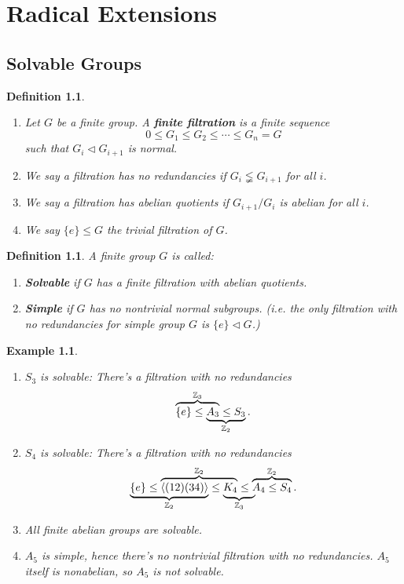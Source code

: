 \documentclass[11pt]{book}
\newtheorem{definition}[theorem]{Definition}
\newtheorem{example}[theorem]{Example}
\begin{document}
\chapter{Radical Extensions}

\section{Solvable Groups}

\begin{definition}
    \begin{enumerate}
        \item Let $G$ be a finite group. A {\bf finite filtration} is a finite sequence
        \[
        0 \leq G_{1} \leq G_{2} \leq \cdots \leq G_{n} = G
        \]
        such that $G_{i}\lhd G_{i+1}$ is normal. 
        \item We say a filtration has no redundancies if $G_{i}\lneqq  G_{i+1}$ for all $i$. 
        \item We say a filtration has abelian quotients if $G_{i+1}/G_{i}$ is abelian for all $i$. 
        \item We say $\{e\}\leq G$ the trivial filtration of $G$. 
    \end{enumerate}
\end{definition}

\begin{definition} \label{def-solvgp}
    A finite group $G$ is called: 
    \begin{enumerate}
        \item {\bf Solvable} if $G$ has a finite filtration with abelian quotients. 
        \item {\bf Simple} if $G$ has no nontrivial normal subgroups. (i.e. the only filtration with no redundancies for simple group $G$ is $\{e\}\lhd G$.)
    \end{enumerate}
\end{definition}

\begin{example}
    \begin{enumerate}
        \item $S_{3}$ is solvable: There's a filtration with no redundancies 
        \[
        \lefteqn{\overbrace{\phantom{\{e\}\leq A_{3}}}^{\mathbb{Z}_{3}}}\{e\}\leq \underbrace{A_{3}\leq S_{3}}_{\mathbb{Z}_{2}}. 
        \]
        \item $S_{4}$ is solvable: There's a filtration with no redundancies
        \[
        \lefteqn{\underbrace{\phantom{\{e\}\leq \langle (12)(34)\rangle}}_{\mathbb{Z}_{2}}}\{e\}\leq \overbrace{\langle (12)(34)\rangle \leq \lefteqn{\underbrace{\phantom{K_{4 \leq A_{4}}}}_{\mathbb{Z}_{3}}}K_{4}}^{\mathbb{Z}_{2}}\leq \overbrace{A_{4}\leq S_{4}}^{\mathbb{Z}_{2}}.
        \]
        \item All finite abelian groups are solvable. 
        \item $A_{5}$ is simple, hence there's no nontrivial filtration with no redundancies. $A_{5}$ itself is nonabelian, so $A_{5}$ is not solvable. 
    \end{enumerate}
\end{example}
\end{document}
